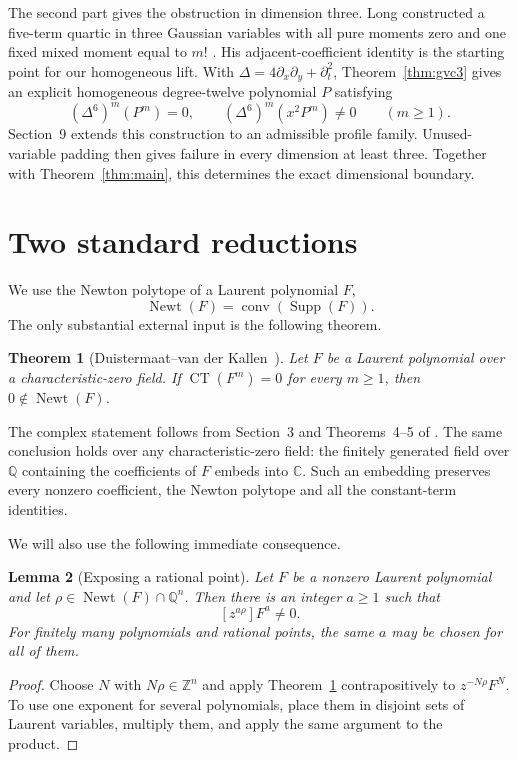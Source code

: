 \documentclass[11pt]{article}
\newtheorem{theorem}{Theorem}[section]
\newtheorem{lemma}[theorem]{Lemma}
\newcommand{\Q}{\mathbb Q}
\newcommand{\Z}{\mathbb Z}
\newcommand{\Newt}{\operatorname{Newt}}
\newcommand{\Supp}{\operatorname{Supp}}
\newcommand{\CT}{\operatorname{CT}}
\begin{document}
The second part gives the obstruction in dimension three.
Long constructed a five-term quartic in three Gaussian variables with
all pure moments zero and one fixed mixed moment equal to $m!$
\cite[Theorem~5.1]{LongGMC}.
His adjacent-coefficient identity is the starting point for our
homogeneous lift.  With
$\Delta=4\partial_x\partial_y+\partial_t^2$, Theorem~\ref{thm:gvc3}
gives an explicit homogeneous degree-twelve polynomial $P$ satisfying
\[
 (\Delta^6)^m(P^m)=0,
 \qquad
 (\Delta^6)^m(x^2P^m)\ne0
 \qquad(m\geq1).
\]
Section~9 extends this construction to an admissible profile family.
Unused-variable padding then gives failure in every dimension at least
three.  Together with Theorem~\ref{thm:main}, this determines the exact
dimensional boundary.

\section{Two standard reductions}

We use the Newton polytope of a Laurent polynomial $F$,
\[
 \Newt(F)=\operatorname{conv}(\Supp(F)).
\]
The only substantial external input is the following theorem.

\begin{theorem}[Duistermaat--van der Kallen~\cite{DK}]\label{thm:dk}
Let $F$ be a Laurent polynomial over a characteristic-zero field.  If
$\CT(F^m)=0$ for every $m\geq1$, then
$0\notin\Newt(F)$.
\end{theorem}

The complex statement follows from Section~3 and Theorems~4--5 of
\cite{DK}.  The same conclusion holds over any characteristic-zero
field: the finitely generated field over $\Q$ containing the coefficients
of $F$ embeds into $\mathbb C$.  Such an embedding preserves every
nonzero coefficient, the Newton polytope and all the constant-term
identities.

We will also use the following immediate consequence.

\begin{lemma}[Exposing a rational point]\label{lem:expose}
Let $F$ be a nonzero Laurent polynomial and let
$\rho\in\Newt(F)\cap\Q^n$.  Then there is an integer $a\geq1$ such that
\[
 [z^{a\rho}]F^a\ne0.
\]
For finitely many polynomials and rational points, the same $a$ may be
chosen for all of them.
\end{lemma}

\begin{proof}
Choose $N$ with $N\rho\in\Z^n$ and apply
Theorem~\ref{thm:dk} contrapositively to
$z^{-N\rho}F^N$.  To use one exponent for several polynomials, place them
in disjoint sets of Laurent variables, multiply them, and apply the same
argument to the product.
\end{proof}
\end{document}
